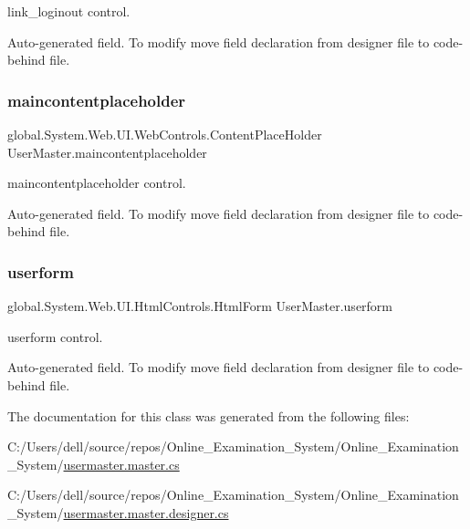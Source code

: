 link\+\_\+loginout control. 

Auto-\/generated field. To modify move field declaration from designer file to code-\/behind file. \mbox{\label{class_user_master_a78563de3fceef2e85d68a156326ee54a}} 
\subsubsection{\texorpdfstring{maincontentplaceholder}{maincontentplaceholder}}
{\footnotesize\ttfamily global.\+System.\+Web.\+U\+I.\+Web\+Controls.\+Content\+Place\+Holder User\+Master.\+maincontentplaceholder\hspace{0.3cm}{\ttfamily [protected]}}



maincontentplaceholder control. 

Auto-\/generated field. To modify move field declaration from designer file to code-\/behind file. \mbox{\label{class_user_master_a0412aad6b02a04dd269a15662be5eb5e}} 
\subsubsection{\texorpdfstring{userform}{userform}}
{\footnotesize\ttfamily global.\+System.\+Web.\+U\+I.\+Html\+Controls.\+Html\+Form User\+Master.\+userform\hspace{0.3cm}{\ttfamily [protected]}}



userform control. 

Auto-\/generated field. To modify move field declaration from designer file to code-\/behind file. 

The documentation for this class was generated from the following files\+:\begin{DoxyCompactItemize}
\item 
C\+:/\+Users/dell/source/repos/\+Online\+\_\+\+Examination\+\_\+\+System/\+Online\+\_\+\+Examination\+\_\+\+System/\mbox{\hyperlink{usermaster_8master_8cs}{usermaster.\+master.\+cs}}\item 
C\+:/\+Users/dell/source/repos/\+Online\+\_\+\+Examination\+\_\+\+System/\+Online\+\_\+\+Examination\+\_\+\+System/\mbox{\hyperlink{usermaster_8master_8designer_8cs}{usermaster.\+master.\+designer.\+cs}}\end{DoxyCompactItemize}
